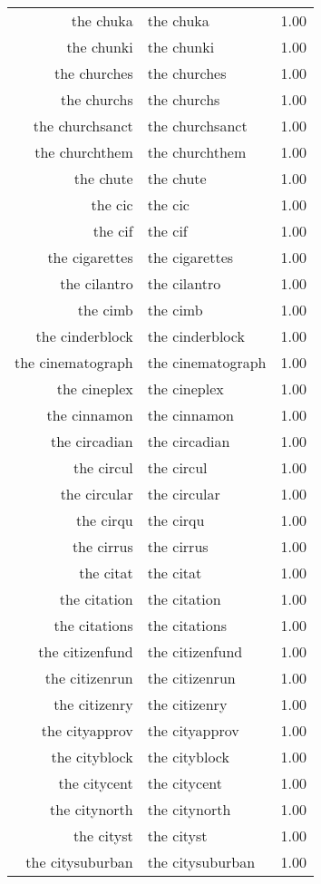 \begin{table}[ht]
\begin{tabular}{rlr}
  the chuka & the chuka & 1.00 \\ 
  the chunki & the chunki & 1.00 \\ 
  the churches & the churches & 1.00 \\ 
  the churchs & the churchs & 1.00 \\ 
  the churchsanct & the churchsanct & 1.00 \\ 
  the churchthem & the churchthem & 1.00 \\ 
  the chute & the chute & 1.00 \\ 
  the cic & the cic & 1.00 \\ 
  the cif & the cif & 1.00 \\ 
  the cigarettes & the cigarettes & 1.00 \\ 
  the cilantro & the cilantro & 1.00 \\ 
  the cimb & the cimb & 1.00 \\ 
  the cinderblock & the cinderblock & 1.00 \\ 
  the cinematograph & the cinematograph & 1.00 \\ 
  the cineplex & the cineplex & 1.00 \\ 
  the cinnamon & the cinnamon & 1.00 \\ 
  the circadian & the circadian & 1.00 \\ 
  the circul & the circul & 1.00 \\ 
  the circular & the circular & 1.00 \\ 
  the cirqu & the cirqu & 1.00 \\ 
  the cirrus & the cirrus & 1.00 \\ 
  the citat & the citat & 1.00 \\ 
  the citation & the citation & 1.00 \\ 
  the citations & the citations & 1.00 \\ 
  the citizenfund & the citizenfund & 1.00 \\ 
  the citizenrun & the citizenrun & 1.00 \\ 
  the citizenry & the citizenry & 1.00 \\ 
  the cityapprov & the cityapprov & 1.00 \\ 
  the cityblock & the cityblock & 1.00 \\ 
  the citycent & the citycent & 1.00 \\ 
  the citynorth & the citynorth & 1.00 \\ 
  the cityst & the cityst & 1.00 \\ 
  the citysuburban & the citysuburban & 1.00 \\ 

\end{tabular}
\end{table}

